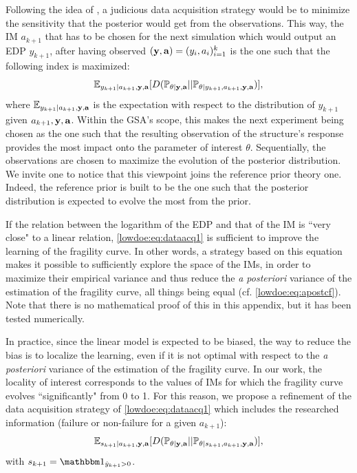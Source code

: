 Following the idea of \citet{da_veiga_global_2015}, a judicious data acquisition strategy would be to minimize the sensitivity that the posterior would get from the observations. This way, the IM $a_{k+1}$ that has to be chosen for the next simulation which would output an EDP $y_{k+1}$, after having observed $(\mathbf{y}, \mathbf{a})=(y_i,a_i)_{i=1}^k$ is the one such that the following index is maximized:
    \begin{equation}\label{lowdoe:eq:dataacq1}
        \mathbb{E}_{y_{k+1}|a_{k+1},\mathbf{y},\mathbf{a}}[D(\mathbb{P}_{\theta|\mathbf{y},\mathbf{a}} || \mathbb{P}_{\theta|y_{k+1},a_{k+1},\mathbf{y},\mathbf{a}} )],
    \end{equation}
where $\mathbb{E}_{y_{k+1}|a_{k+1},\mathbf{y},\mathbf{a}}$ is the expectation with respect to the distribution of $y_{k+1}$ given $a_{k+1},\mathbf{y},\mathbf{a}$.
Within the GSA's scope, this makes the next experiment being chosen as the one such that the resulting observation of the structure's response provides the most impact onto the parameter of interest $\theta$. Sequentially, the observations are chosen to maximize the evolution of the posterior distribution. We invite one to notice that this viewpoint joins the reference prior theory one. Indeed, the reference prior is built to be the one such that the posterior distribution is expected to evolve the most from the prior. %

If the relation between the logarithm of the EDP and that of the IM is ``very close" to a linear relation, \cref{lowdoe:eq:dataacq1} is sufficient to improve the learning of the fragility curve. In other words, a strategy based on this equation makes it possible to sufficiently explore the space of the IMs, in order to maximize their empirical variance and thus reduce the \emph{a posteriori} variance of the estimation of the fragility curve, all things being equal (cf. \cref{lowdoe:eq:apostcf}). Note that there is no mathematical proof of this in this appendix, but it has been tested numerically. 

In practice, since the linear model is expected to be biased, the way to reduce the bias is to localize the learning, even if it is not optimal with respect to the \emph{a posteriori} variance of the estimation of the fragility curve. In our work, the locality of interest corresponds to the values of IMs for which the fragility curve evolves ``significantly" from 0 to 1. For this reason, we propose a refinement of the data acquisition strategy of \cref{lowdoe:eq:dataacq1} which includes the researched information (failure or non-failure for a given $a_{k+1}$):
    \begin{equation}\label{lowdoe:eq:ALs}
        \mathbb{E}_{ s_{k+1}|a_{k+1},\mathbf{y},\mathbf{a}}[D(\mathbb{P}_{\theta|\mathbf{y},\mathbf{a}} || \mathbb{P}_{\theta|s_{k+1},a_{k+1},\mathbf{y},\mathbf{a}} )],
    \end{equation}
with $s_{k+1}=\indic_{\hat y_{k+1}>0}$.


